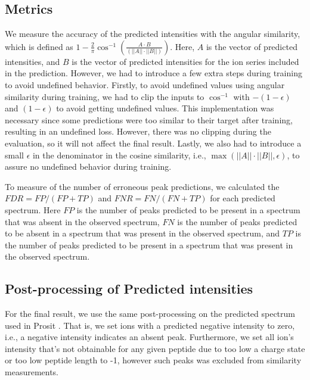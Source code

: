 \documentclass[10pt,a4paper]{article}
\begin{document}
\subsection*{Metrics}

We measure the accuracy of the predicted intensities with the angular similarity, which is defined as $1-\frac{2}{\pi} \cos^{-1}\left(\frac{A \cdot B}{(||A||\cdot||B||)}\right)$. Here, $A$ is the vector of predicted intensities, and $B$ is the vector of predicted intensities for the ion series included in the prediction. However, we had to introduce a few extra steps during training to avoid undefined behavior. Firstly, to avoid undefined values using angular similarity during training, we had to clip the inputs to $\cos^{-1}$ with $-(1-\epsilon)$ and $(1-\epsilon)$ to avoid getting undefined values. This implementation was necessary since some predictions were too similar to their target after training, resulting in an undefined loss. However, there was no clipping during the evaluation, so it will not affect the final result. Lastly, we also had to introduce a small $\epsilon$ in the denominator in the cosine similarity, i.e., $\max(||A||\cdot||B||, \epsilon)$, to assure no undefined behavior during training.


To measure of the number of erroneous peak predictions, we calculated the $\mathit{FDR}=\mathit{FP}/(\mathit{FP}+\mathit{TP})$ and $\mathit{FNR}=\mathit{FN}/(\mathit{FN}+\mathit{TP})$ for each predicted spectrum. Here $\mathit{FP}$ is the number of peaks predicted to be present in a spectrum that was absent in the observed spectrum, $\mathit{FN}$ is the number of peaks predicted to be absent in a spectrum that was present in the observed spectrum, and $\mathit{TP}$ is the number of peaks predicted to be present in a spectrum that was present in the observed spectrum.

\subsection*{Post-processing of Predicted intensities}
For the final result, we use the same post-processing on the predicted spectrum used in Prosit ​\cite{Gessulat2019-el}. That is, we set ions with a predicted negative intensity to zero, i.e., a negative intensity indicates an absent peak. Furthermore, we set all ion's intensity that's not obtainable for any given peptide due to too low a charge state or too low peptide length to -1, however such peaks was excluded from similarity measurements.
\end{document}
